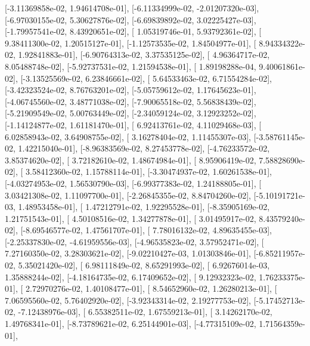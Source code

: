 \documentclass{article}
\begin{document}
       [-3.11369858e-02,  1.94614708e-01],
       [-6.11334999e-02, -2.01207320e-03],
       [-6.97030155e-02,  5.30627876e-02],
       [-6.69839892e-02,  3.02225427e-03],
       [-1.79957541e-02,  8.43920651e-02],
       [ 1.05319746e-01,  5.93792361e-02],
       [ 9.38411300e-02,  1.20515127e-01],
       [-1.12573535e-02,  1.84504977e-01],
       [ 8.94334322e-02,  1.92841883e-01],
       [-6.90764313e-02,  3.37535125e-02],
       [ 4.96364717e-02,  8.05488748e-02],
       [-5.92737531e-02,  1.21594538e-01],
       [ 1.89198288e-04,  9.40061861e-02],
       [-3.13525569e-02,  6.23846661e-02],
       [ 5.64533463e-02,  6.71554284e-02],
       [-3.42323524e-02,  8.76763201e-02],
       [-5.05759612e-02,  1.17645623e-01],
       [-4.06745560e-02,  3.48771038e-02],
       [-7.90065518e-02,  5.56838439e-02],
       [-5.21909549e-02,  5.00763449e-02],
       [-2.34059124e-02,  3.12923252e-02],
       [-1.14124877e-02,  1.61181470e-01],
       [ 6.92413761e-02,  4.11029468e-03],
       [ 6.02858943e-02,  3.64908755e-02],
       [ 3.16278404e-02,  1.11455307e-03],
       [-3.58761145e-02,  1.42215040e-01],
       [-8.96383569e-02,  8.27453778e-02],
       [-4.76233572e-02,  3.85374620e-02],
       [ 3.72182610e-02,  1.48674984e-01],
       [ 8.95906419e-02,  7.58828690e-02],
       [ 3.58412360e-02,  1.15788114e-01],
       [-3.30474937e-02,  1.60261538e-01],
       [-4.03274953e-02,  1.56530790e-03],
       [-6.99377383e-02,  1.24188805e-01],
       [ 3.03421308e-02,  1.11097700e-01],
       [-2.26845355e-02,  8.84704260e-02],
       [-5.10191721e-03,  1.48953458e-01],
       [ 1.47212791e-02,  1.92295528e-01],
       [-8.35905169e-02,  1.21751543e-01],
       [ 4.50108516e-02,  1.34277878e-01],
       [ 3.01495917e-02,  8.43579240e-02],
       [-8.69546577e-02,  1.47561707e-01],
       [ 7.78016132e-02,  4.89635455e-03],
       [-2.25337830e-02, -4.61959556e-03],
       [-4.96535823e-02,  3.57952471e-02],
       [ 7.27160350e-02,  3.28303621e-02],
       [-9.02210427e-03,  1.01303846e-01],
       [-6.85211957e-02,  5.35021420e-02],
       [ 6.98111849e-02,  8.65291993e-02],
       [ 6.92676014e-03,  1.35888244e-02],
       [-4.18164735e-02,  6.17409652e-02],
       [ 9.12932323e-02,  1.76233375e-01],
       [ 2.72970276e-02,  1.40108477e-01],
       [ 8.54652960e-02,  1.26280213e-01],
       [ 7.06595560e-02,  5.76402920e-02],
       [-3.92343314e-02,  2.19277753e-02],
       [-5.17452713e-02, -7.12438976e-03],
       [ 6.55382511e-02,  1.67559213e-01],
       [ 3.14262170e-02,  1.49768341e-01],
       [-8.73789621e-02,  6.25144901e-03],
       [-4.77315109e-02,  1.71564359e-01],
\end{document}
